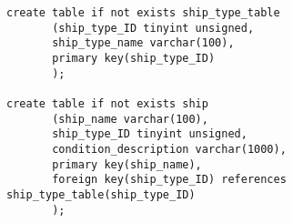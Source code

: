 \begin{Verbatim}[]
create table if not exists ship_type_table
       (ship_type_ID tinyint unsigned,
       ship_type_name varchar(100),
       primary key(ship_type_ID)
       );

create table if not exists ship
       (ship_name varchar(100),
       ship_type_ID tinyint unsigned,
       condition_description varchar(1000),
       primary key(ship_name),
       foreign key(ship_type_ID) references ship_type_table(ship_type_ID)
       );
\end{Verbatim}